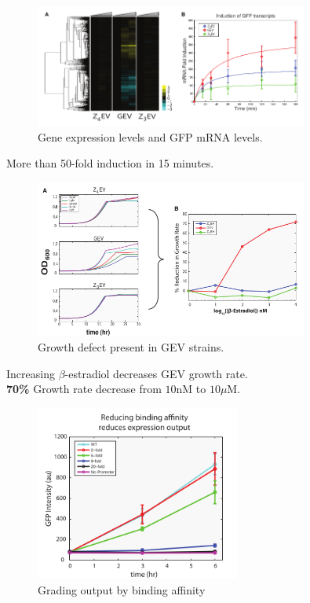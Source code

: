 \documentclass{beamer}
\begin{document}
\begin{frame}
    \begin{figure}[ht!]
        \centering
        \includegraphics[width=0.8\textwidth]{McIsaacfig4.png}
        \caption{Gene expression levels and GFP mRNA levels.}
        \label{fig:mRNA}
    \end{figure}
    More than 50-fold induction in 15 minutes.
\end{frame}

\begin{frame}
    \begin{figure}[ht!]
        \centering
        \includegraphics[width=0.8\textwidth]{McIsaacfig5.png}
        \caption{Growth defect present in GEV strains.}
        \label{fig:growthGEV}
    \end{figure}
    Increasing $\beta$-estradiol decreases GEV growth rate.\\
    \textbf{70\%} Growth rate decrease from $10$nM to $10\mu$M.
\end{frame}

\begin{frame}
    \begin{figure}[ht!]
        \centering
        \includegraphics[width=0.6\textwidth]{McIsaacfig6.png}
        \caption{Grading output by binding affinity}
        \label{fig:growthGEV}
    \end{figure}
\end{frame}
\end{document}
